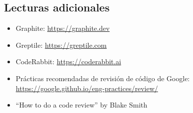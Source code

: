 \documentclass[a4paper]{article}
\begin{document}
\subsection{Lecturas adicionales}

\begin{itemize}
    \item Graphite: \url{https://graphite.dev}
    \item Greptile: \url{https://greptile.com}
    \item CodeRabbit: \url{https://coderabbit.ai}
    \item Prácticas recomendadas de revisión de código de Google: \url{https://google.github.io/eng-practices/review/}
    \item ``How to do a code review'' by Blake Smith
\end{itemize}

\end{document}
